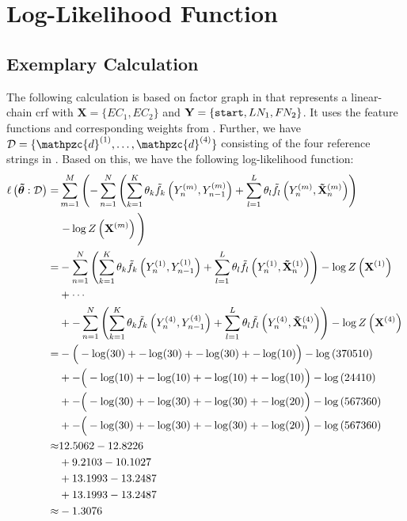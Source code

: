 \section{Log-Likelihood Function}\label{app:sec-log-likelihood-function}
\subsection{Exemplary Calculation}\label{app:subsec-llg-example-calculation}
The following calculation is based on \gls{factor graph} in  that represents a \gls{linear-chain crf} with $\mathbf{X}=\{EC_1,EC_2\}$ and $\mathbf{Y}=\{\texttt{start},LN_1,F\hspace{-0.07em} N_2\}$.
It uses the \glspl{feature function} and corresponding weights from .
Further, we have $\mathcal{D}=\{\mathpzc{d}^{(1)},\dots,\mathpzc{d}^{(4)}\}$ consisting of the four reference strings in .
Based on this, we have the following log-likelihood function:
\begin{equation*}
  \begin{split}
    \ell\left(\bm{\tilde{\theta}}:\mathcal{D}\right) = & \sum_{m=1}^M \left(-\sum_{n=1}^N \left(\sum_{k=1}^K\theta_k \tilde{f}_k\left(Y_n^{(m)},Y_{n-1}^{(m)}\right)+\sum_{l=1}^L\theta_l \tilde{f}_l\left(Y_n^{(m)},\mathbf{\tilde{X}}_n^{(m)}\right)\right)\right. \\
    &\left.-\log Z\left(\mathbf{X}^{(m)}\right)\vphantom{\sum_{l=1}^L}\right)\\
   =&-\sum_{n=1}^N \left(\sum_{k=1}^K\theta_k \tilde{f}_k\left(Y_n^{(1)},Y_{n-1}^{(1)}\right)+\sum_{l=1}^L\theta_l \tilde{f}_l\left(Y_n^{(1)},\mathbf{\tilde{X}}_n^{(1)}\right)\right)-\log Z\left(\mathbf{X}^{(1)}\right)\vphantom{\sum_{l=1}^L}\\
   &+\cdots\\
   &+-\sum_{n=1}^N \left(\sum_{k=1}^K\theta_k \tilde{f}_k\left(Y_n^{(4)},Y_{n-1}^{(4)}\right)+\sum_{l=1}^L\theta_l \tilde{f}_l\left(Y_n^{(4)},\mathbf{\tilde{X}}_n^{(4)}\right)\right)-\log Z\left(\mathbf{X}^{(4)}\right)\vphantom{\sum_{l=1}^L}\\
    =&-\Big(-\log(30)+-\log(30)+-\log(30)+-\log(10)\Big)-\log\left(370510\right)\\
    &+-\Big(-\log(10)+-\log(10)+-\log(10)+-\log(10)\Big)-\log\left(24410\right)\\
    &+-\Big(-\log(30)+-\log(30)+-\log(30)+-\log(20)\Big)-\log\left(567360\right)\\
    &+-\Big(-\log(30)+-\log(30)+-\log(30)+-\log(20)\Big)-\log\left(567360\right)\\
    \approx&12.5062-12.8226\\
    &+9.2103-10.1027\\
    &+13.1993-13.2487\\
    &+13.1993-13.2487\\
    \approx&-1.3076
 \end{split}
\end{equation*}
